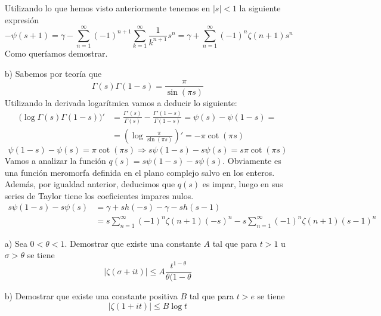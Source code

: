 \documentclass[twoside]{article}
\begin{document}
\begin{sol}
\begin{itemize}
$$$$
Utilizando lo que hemos visto anteriormente tenemos en $|s|<1$ la siguiente expresión
$$
-\psi(s+1) = \gamma -  \sum_{n=1}^\infty(-1)^{n+1}\sum_{k=1}^\infty\frac{1}{k^{n+1}}  s^n = \gamma + \sum_{n=1}^\infty(-1)^{n}\zeta(n+1) s^n
$$
Como queríamos demostrar.
\newpage
\item[b)] Sabemos por teoría que 
$$\Gamma(s)\Gamma(1-s)=\frac{\pi}{\sin(\pi s)}
$$
Utilizando la derivada logarítmica vamos a deducir lo siguiente:
\begin{align*}
(\log{\Gamma(s)\Gamma(1-s))}' & = \frac{\Gamma'(s)}{\Gamma(s)} - \frac{\Gamma'(1-s)}{\Gamma(1-s)} = \psi(s)-\psi(1-s) = \\
&=\left(\log\frac{\pi}{\sin(\pi s)}\right)'  = -\pi\cot(\pi s)
\end{align*}
$$
\psi(1-s)-\psi(s) = \pi\cot(\pi s) \Longrightarrow s\psi(1-s)-s\psi(s) = s\pi\cot(\pi s)
$$
Vamos a analizar la función $q(s) = s\psi(1-s)-s\psi(s)$. Obviamente es una función meromorfa definida en el plano complejo salvo en los enteros. Además, por igualdad anterior, deducimos que $q(s)$ es impar, luego en sus series de Taylor tiene los coeficientes impares nulos.
\begin{align*}
s\psi(1-s)-s\psi(s) & = \gamma + sh(-s) -\gamma - sh(s-1)\\
&=s\sum_{n=1}^\infty(-1)^{n}\zeta(n+1) (-s)^n - s\sum_{n=1}^\infty(-1)^{n}\zeta(n+1) (s-1)^n
\end{align*}
\end{itemize}
\end{sol}
\newpage

\begin{ejercicio}{7}
\begin{itemize}
\item[]
\item[a)] Sea $0<\theta<1$. Demostrar que existe una constante $A$ tal que para $t>1$ u $\sigma>\theta$ se tiene
$$
|\zeta(\sigma +it)|\leq A\frac{t^{1-\theta}}{\theta(1-\theta}
$$
\item[b)] Demostrar que existe una constante positiva $B$ tal que para $t>e$ se tiene
$$
|\zeta(1+it)|\leq B\log t
$$
\end{itemize}
\end{ejercicio}
\end{document}

